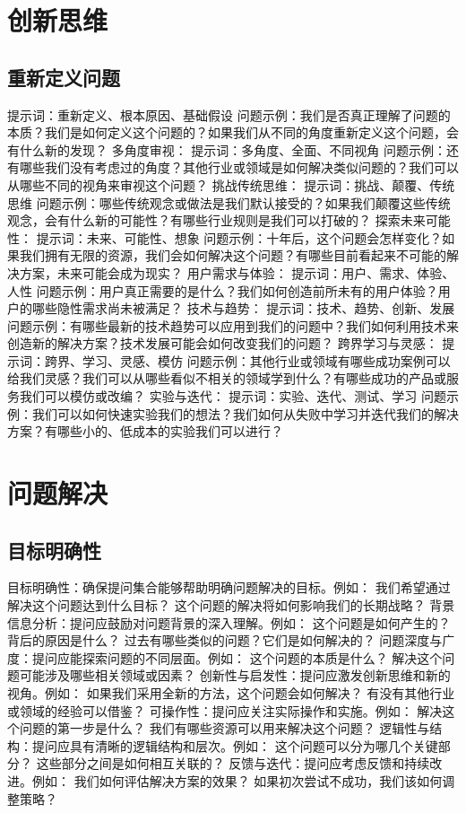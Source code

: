 \documentclass[12pt]{book}
\begin{document}
\section{创新思维}
\subsection{重新定义问题}
提示词：重新定义、根本原因、基础假设
问题示例：我们是否真正理解了问题的本质？我们是如何定义这个问题的？如果我们从不同的角度重新定义这个问题，会有什么新的发现？
多角度审视：
提示词：多角度、全面、不同视角
问题示例：还有哪些我们没有考虑过的角度？其他行业或领域是如何解决类似问题的？我们可以从哪些不同的视角来审视这个问题？
挑战传统思维：
提示词：挑战、颠覆、传统思维
问题示例：哪些传统观念或做法是我们默认接受的？如果我们颠覆这些传统观念，会有什么新的可能性？有哪些行业规则是我们可以打破的？
探索未来可能性：
提示词：未来、可能性、想象
问题示例：十年后，这个问题会怎样变化？如果我们拥有无限的资源，我们会如何解决这个问题？有哪些目前看起来不可能的解决方案，未来可能会成为现实？
用户需求与体验：
提示词：用户、需求、体验、人性
问题示例：用户真正需要的是什么？我们如何创造前所未有的用户体验？用户的哪些隐性需求尚未被满足？
技术与趋势：
提示词：技术、趋势、创新、发展
问题示例：有哪些最新的技术趋势可以应用到我们的问题中？我们如何利用技术来创造新的解决方案？技术发展可能会如何改变我们的问题？
跨界学习与灵感：
提示词：跨界、学习、灵感、模仿
问题示例：其他行业或领域有哪些成功案例可以给我们灵感？我们可以从哪些看似不相关的领域学到什么？有哪些成功的产品或服务我们可以模仿或改编？
实验与迭代：
提示词：实验、迭代、测试、学习
问题示例：我们可以如何快速实验我们的想法？我们如何从失败中学习并迭代我们的解决方案？有哪些小的、低成本的实验我们可以进行？

\section{问题解决}
\subsection{目标明确性}
目标明确性：确保提问集合能够帮助明确问题解决的目标。例如：
我们希望通过解决这个问题达到什么目标？
这个问题的解决将如何影响我们的长期战略？
背景信息分析：提问应鼓励对问题背景的深入理解。例如：
这个问题是如何产生的？背后的原因是什么？
过去有哪些类似的问题？它们是如何解决的？
问题深度与广度：提问应能探索问题的不同层面。例如：
这个问题的本质是什么？
解决这个问题可能涉及哪些相关领域或因素？
创新性与启发性：提问应激发创新思维和新的视角。例如：
如果我们采用全新的方法，这个问题会如何解决？
有没有其他行业或领域的经验可以借鉴？
可操作性：提问应关注实际操作和实施。例如：
解决这个问题的第一步是什么？
我们有哪些资源可以用来解决这个问题？
逻辑性与结构：提问应具有清晰的逻辑结构和层次。例如：
这个问题可以分为哪几个关键部分？
这些部分之间是如何相互关联的？
反馈与迭代：提问应考虑反馈和持续改进。例如：
我们如何评估解决方案的效果？
如果初次尝试不成功，我们该如何调整策略？
\end{document}
